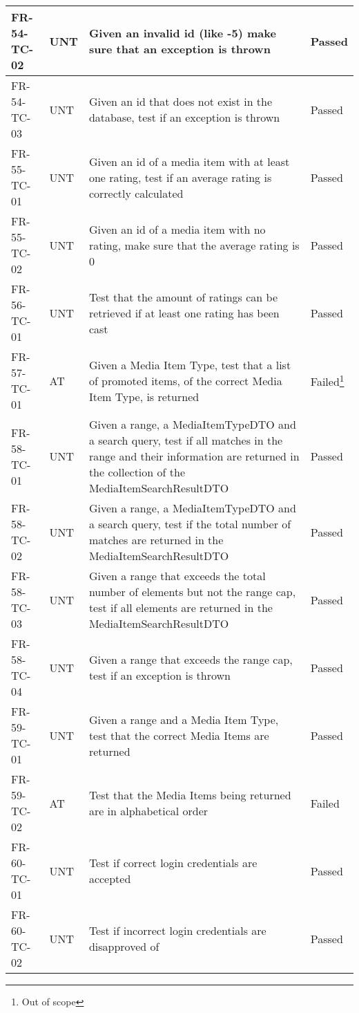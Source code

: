 \documentclass[../report.tex]{subfiles}
\begin{document}
\begin{longtable}{|L{2.1cm}|L{0.8cm}|L{9cm}|L{1.2cm}|}
FR-54-TC-02&UNT&Given an invalid id (like -5) make sure that an exception is thrown&Passed  \\ \hline
FR-54-TC-03&UNT&Given an id that does not exist in the database, test if an exception is thrown&Passed  \\ \hline
FR-55-TC-01&UNT&Given an id of a media item with at least one rating, test if an average rating is correctly calculated &Passed  \\ \hline
FR-55-TC-02&UNT&Given an id of a media item with no rating, make sure that the average rating is 0&Passed  \\ \hline
FR-56-TC-01&UNT&Test that the amount of ratings can be retrieved if at least one rating has been cast&Passed  \\ \hline
FR-57-TC-01&AT&Given a Media Item Type, test that a list of promoted items, of the correct Media Item Type, is returned&Failed\footnote{Out of scope}  \\ \hline
FR-58-TC-01&UNT&Given a range, a MediaItemTypeDTO and a search query, test if all matches in the range and their information are returned in the collection of the MediaItemSearchResultDTO&Passed  \\ \hline
FR-58-TC-02&UNT&Given a range, a MediaItemTypeDTO and a search query, test if the total number of matches are returned in the MediaItemSearchResultDTO&Passed  \\ \hline
FR-58-TC-03&UNT&Given a range that exceeds the total number of elements but not the range cap, test if all elements are returned in the MediaItemSearchResultDTO&Passed  \\ \hline
FR-58-TC-04&UNT&Given a range that exceeds the range cap, test if an exception is thrown&Passed  \\ \hline
FR-59-TC-01&UNT&Given a range and a Media Item Type,  test that the correct Media Items are returned&Passed  \\ \hline
FR-59-TC-02&AT&Test that the Media Items being returned are in alphabetical order&Failed  \\ \hline
FR-60-TC-01&UNT&Test if correct login credentials are accepted&Passed  \\ \hline
FR-60-TC-02&UNT&Test if incorrect login credentials are disapproved of&Passed  \\ \hline

\end{longtable}
\end{document}
